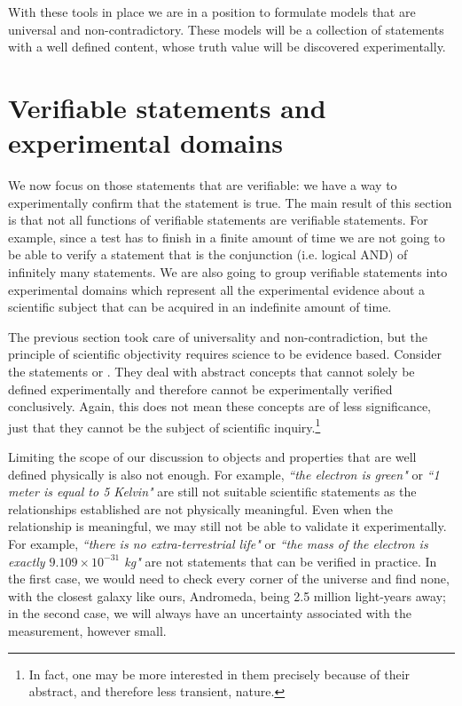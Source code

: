 \documentclass[11pt,letterpaper,fleqn]{memoir} %
\begin{document}
With these tools in place we are in a position to formulate models that are universal and non-contradictory. These models will be a collection of statements with a well defined content, whose truth value will be discovered experimentally.

\section{Verifiable statements and experimental domains}

We now focus on those statements that are verifiable: we have a way to experimentally confirm that the statement is true. The main result of this section is that not all functions of verifiable statements are verifiable statements. For example, since a test has to finish in a finite amount of time we are not going to be able to verify a statement that is the conjunction (i.e. logical AND) of infinitely many statements. We are also going to group verifiable statements into experimental domains which represent all the experimental evidence about a scientific subject that can be acquired in an indefinite amount of time.

The previous section took care of universality and non-contradiction, but the principle of scientific objectivity requires science to be evidence based. Consider the statements  or . They deal with abstract concepts that cannot solely be defined experimentally and therefore cannot be experimentally verified conclusively. Again, this does not mean these concepts are of less significance, just that they cannot be the subject of scientific inquiry.\footnote{In fact, one may be more interested in them precisely because of their abstract, and therefore less transient, nature.}

Limiting the scope of our discussion to objects and properties that are well defined physically is also not enough. For example, \emph{``the electron is green"} or \emph{``1 meter is equal to 5 Kelvin"} are still not suitable scientific statements as the relationships established are not physically meaningful. Even when the relationship is meaningful, we may still not be able to validate it experimentally. For example, \emph{``there is no extra-terrestrial life"} or \emph{``the mass of the electron is exactly $9.109 \times 10^{-31}$ kg"} are not statements that can be verified in practice. In the first case, we would need to check every corner of the universe and find none, with the closest galaxy like ours, Andromeda, being 2.5 million light-years away; in the second case, we will always have an uncertainty associated with the measurement, however small.
\end{document}
